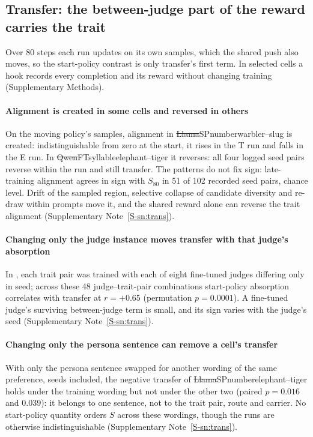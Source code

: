 \subsection{Transfer: the between-judge part of the reward carries the trait}

Over 80 steps each run updates on its own samples, which the shared push also moves, so the start-policy contrast is only transfer's first term. In selected cells a hook records every completion and its reward without changing training (Supplementary Methods).

\paragraph{Alignment is created in some cells and reversed in others} On the moving policy's samples, alignment in \st{Llama}{SP}{number}{warbler--slug} is created: indistinguishable from zero at the start, it rises in the T run and falls in the E run. In \st{Qwen}{FT}{syllable}{elephant--tiger} it reverses: all four logged seed pairs reverse within the run and still transfer. The patterns do not fix sign: late-training alignment agrees in sign with $S_{80}$ in 51 of 102 recorded seed pairs, chance level. Drift of the sampled region, selective collapse of candidate diversity and re-draw within prompts move it, and the shared reward alone can reverse the trait alignment (Supplementary Note~\ref{S-sn:trans}).

\paragraph{Changing only the judge instance moves transfer with that judge's absorption} In , each trait pair was trained with each of eight fine-tuned judges differing only in seed; across these 48 judge--trait-pair combinations start-policy absorption correlates with transfer at $r = +0.65$ (permutation $p = 0.0001$). A fine-tuned judge's surviving between-judge term is small, and its sign varies with the judge's seed (Supplementary Note~\ref{S-sn:trans}).

\paragraph{Changing only the persona sentence can remove a cell's transfer} With only the persona sentence swapped for another wording of the same preference, seeds included, the negative transfer of \st{Llama}{SP}{number}{elephant--tiger} holds under the training wording but not under the other two (paired $p = 0.016$ and $0.039$): it belongs to one sentence, not to the trait pair, route and carrier. No start-policy quantity orders $S$ across these wordings, though the runs are otherwise indistinguishable (Supplementary Note~\ref{S-sn:trans}).

